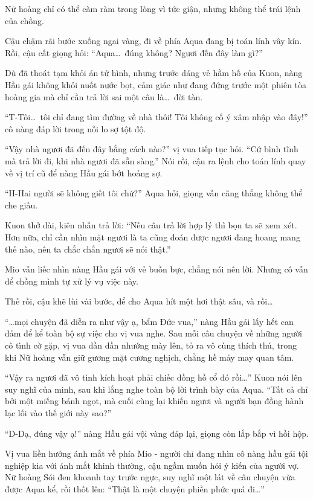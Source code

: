 \documentclass[../main.tex]{subfiles}
\begin{document}
Nữ hoàng chỉ có thể càm ràm trong lòng vì tức giận, nhưng không thể trái lệnh của chồng.

Cậu chậm rãi bước xuống ngai vàng, đi về phía Aqua đang bị toán lính vây kín. Rồi, cậu cất giọng hỏi: ``Aqua\dots\ đúng không? Ngươi đến đây làm gì?''

Dù đã thoát tạm khỏi án tử hình, nhưng trước dáng vẻ hầm hố của Kuon, nàng Hầu gái không khỏi nuốt nước bọt, cảm giác như đang đứng trước một phiên tòa hoàng gia mà chỉ cần trả lời sai một câu là\dots\ đời tàn.

``T-Tôi\dots\ tôi chỉ đang tìm đường về nhà thôi! Tôi không cố ý xâm nhập vào đây!'' cô nàng đáp lời trong nỗi lo sợ tột độ.

``Vậy nhà ngươi đã đến đây bằng cách nào?'' vị vua tiếp tục hỏi. ``Cứ bình tĩnh mà trả lời đi, khi nhà ngươi đã sẵn sàng.'' Nói rồi, cậu ra lệnh cho toán lính quay về vị trí cũ để nàng Hầu gái bớt hoảng sợ.

``H-Hai người sẽ không giết tôi chứ?'' Aqua hỏi, giọng vẫn căng thẳng không thể che giấu.

Kuon thở dài, kiên nhẫn trả lời: ``Nếu câu trả lời hợp lý thì bọn ta sẽ xem xét. Hơn nữa, chỉ cần nhìn mặt ngươi là ta cũng đoán được ngươi đang hoang mang thế nào, nên ta chắc chắn ngươi sẽ nói thật.''

Mio vẫn liếc nhìn nàng Hầu gái với vẻ buồn bực, chẳng nói nên lời. Nhưng cô vẫn để chồng mình tự xử lý vụ việc này.

Thế rồi, cậu khẽ lùi vài bước, để cho Aqua hít một hơi thật sâu, và rồi\dots

\ct

``\dots mọi chuyện đã diễn ra như vậy ạ, bẩm Đức vua,'' nàng Hầu gái lấy hết can đảm để kể toàn bộ sự việc cho vị vua nghe. Sau mỗi câu chuyện về những người cô tình cờ gặp, vị vua dần dần nhướng mày lên, tỏ ra vô cùng thích thú, trong khi Nữ hoàng vẫn giữ gương mặt cương nghịch, chẳng hề mảy may quan tâm.

``Vậy ra ngươi đã vô tình kích hoạt phải chiếc đồng hồ cổ đó rồi\dots'' Kuon nói lên suy nghĩ của mình, sau khi lắng nghe toàn bộ lời trình bày của Aqua. ``Tất cả chỉ bởi một miếng bánh ngọt, mà cuối cùng lại khiến ngươi và người bạn đồng hành lạc lối vào thế giới này sao?''

``D-Dạ, đúng vậy ạ!'' nàng Hầu gái vội vàng đáp lại, giọng còn lắp bắp vì hồi hộp.

Vị vua liền hướng ánh mắt về phía Mio - người chỉ đang nhìn cô nàng hầu gái tội nghiệp kia với ánh mắt khinh thường, cậu ngầm muốn hỏi ý kiến của người vợ. Nữ hoàng Sói đen khoanh tay trước ngực, suy nghĩ một lát về câu chuyện vừa được Aqua kể, rồi thốt lên: ``Thật là một chuyện phiền phức quá đi\dots''
\end{document}
